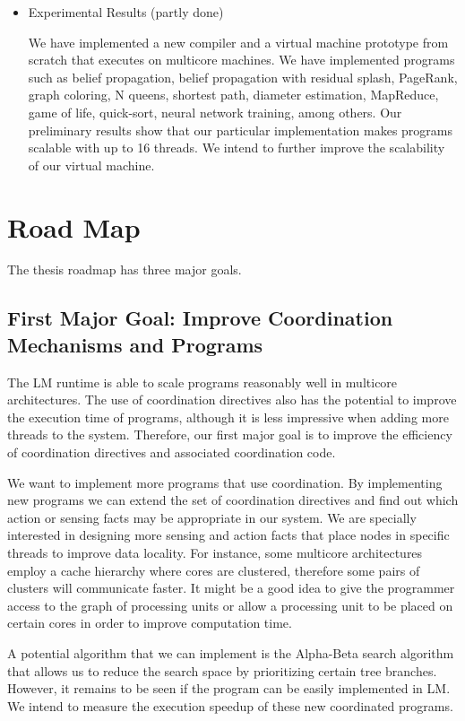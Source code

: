 \documentclass[10pt]{article}
\begin{document}
\begin{itemize}
   \item Experimental Results (partly done)

   We have implemented a new compiler and a virtual machine prototype from
   scratch that executes on multicore machines.  We have implemented programs
   such as belief propagation, belief propagation with residual splash,
   PageRank, graph coloring, N queens, shortest path, diameter estimation,
   MapReduce, game of life, quick-sort, neural network training, among others.
   Our preliminary results show that our particular implementation makes
   programs scalable with up to 16 threads. We intend to further improve the
   scalability of our virtual machine.
   
\end{itemize}

\section{Road Map}

The thesis roadmap has three major goals.

\subsection{First Major Goal: Improve Coordination Mechanisms and Programs}

The LM runtime is able to scale programs reasonably well in multicore
architectures. The use of coordination directives also has the potential to
improve the execution time of programs, although it is less impressive when
adding more threads to the system. Therefore, our first major goal is to improve
the efficiency of coordination directives and associated coordination code.

We want to implement more programs that use coordination. By implementing new
programs we can extend the set of coordination directives and find out which
action or sensing facts may be appropriate in our system. We are specially
interested in designing more sensing and action facts that place nodes in
specific threads to improve data locality.  For instance, some multicore
architectures employ a cache hierarchy where cores are clustered, therefore some
pairs of clusters will communicate faster. It might be a good idea to give the
programmer access to the graph of processing units or allow a processing unit to
be placed on certain cores in order to improve computation time.

A potential algorithm that we can implement is the Alpha-Beta search algorithm
that allows us to reduce the search space by prioritizing certain tree branches.
However, it remains to be seen if the program can be easily implemented in LM.
We intend to measure the execution speedup of these new coordinated programs.
\end{document}
